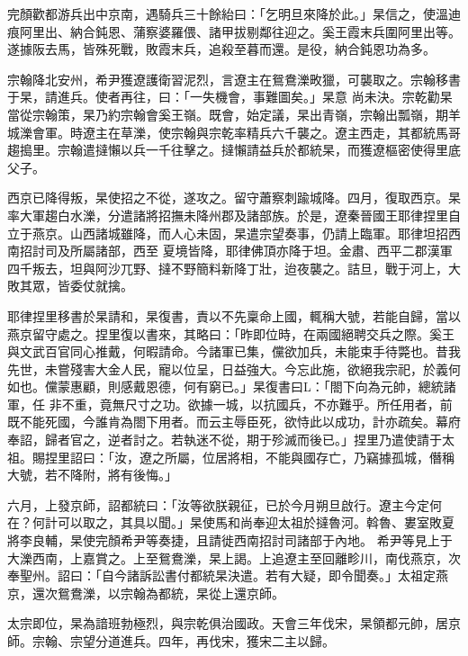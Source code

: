 \begin{pinyinscope}
 完顏歡都游兵出中京南，遇騎兵三十餘紿曰：「乞明旦來降於此。」杲信之，使溫迪痕阿里出、納合鈍恩、蒲察婆羅偎、諸甲拔剔鄰往迎之。奚王霞末兵圍阿里出等。遂據阪去馬，皆殊死戰，敗霞末兵，追殺至暮而還。是役，納合鈍恩功為多。



 宗翰降北安州，希尹獲遼護衛習泥烈，言遼主在鴛鴦濼畋獵，可襲取之。宗翰移書于杲，請進兵。使者再往，曰：「一失機會，事難圖矣。」杲意
 尚未決。宗乾勸杲當從宗翰策，杲乃約宗翰會奚王嶺。既會，始定議，杲出青嶺，宗翰出瓢嶺，期羊城濼會軍。時遼主在草濼，使宗翰與宗乾率精兵六千襲之。遼主西走，其都統馬哥趨搗里。宗翰遣撻懶以兵一千往擊之。撻懶請益兵於都統杲，而獲遼樞密使得里底父子。



 西京已降得叛，杲使招之不從，遂攻之。留守蕭察刺踰城降。四月，復取西京。杲率大軍趨白水濼，分遣諸將招撫未降州郡及諸部族。於是，遼秦晉國王耶律捏里自立于燕京。山西諸城雖降，而人心未固，杲遣宗望奏事，仍請上臨軍。耶律坦招西南招討司及所屬諸部，西至
 夏境皆降，耶律佛頂亦降于坦。金肅、西平二郡漢軍四千叛去，坦與阿沙兀野、撻不野簡料新降丁壯，迨夜襲之。詰旦，戰于河上，大敗其眾，皆委仗就擒。



 耶律捏里移書於杲請和，杲復書，責以不先稟命上國，輒稱大號，若能自歸，當以燕京留守處之。捏里復以書來，其略曰：「昨即位時，在兩國絕聘交兵之際。奚王與文武百官同心推戴，何暇請命。今諸軍已集，儻欲加兵，未能束手待斃也。昔我先世，未嘗殘害大金人民，寵以位呈，日益強大。今忘此施，欲絕我宗祀，於義何如也。儻蒙惠顧，則感戴恩德，何有窮已。」杲復書曰L：「閤下向為元帥，總統諸軍，任
 非不重，竟無尺寸之功。欲據一城，以抗國兵，不亦難乎。所任用者，前既不能死國，今誰肯為閤下用者。而云主辱臣死，欲恃此以成功，計亦疏矣。幕府奉詔，歸者官之，逆者討之。若執迷不從，期于殄滅而後已。」捏里乃遣使請于太祖。賜捏里詔曰：「汝，遼之所屬，位居將相，不能與國存亡，乃竊據孤城，僭稱大號，若不降附，將有後悔。」



 六月，上發京師，詔都統曰：「汝等欲朕親征，已於今月朔旦啟行。遼主今定何在？何計可以取之，其具以聞。」杲使馬和尚奉迎太祖於撻魯河。斡魯、婁室敗夏將李良輔，杲使完顏希尹等奏捷，且請徙西南招討司諸部于內地。
 希尹等見上于大濼西南，上嘉賞之。上至鴛鴦濼，杲上謁。上追遼主至回離畛川，南伐燕京，次奉聖州。詔曰：「自今諸訴訟書付都統杲決遣。若有大疑，即令聞奏。」太祖定燕京，還次鴛鴦濼，以宗翰為都統，杲從上還京師。



 太宗即位，杲為諳班勃極烈，與宗乾俱治國政。天會三年伐宋，杲領都元帥，居京師。宗翰、宗望分道進兵。四年，再伐宋，獲宋二主以歸。




\end{pinyinscope}
